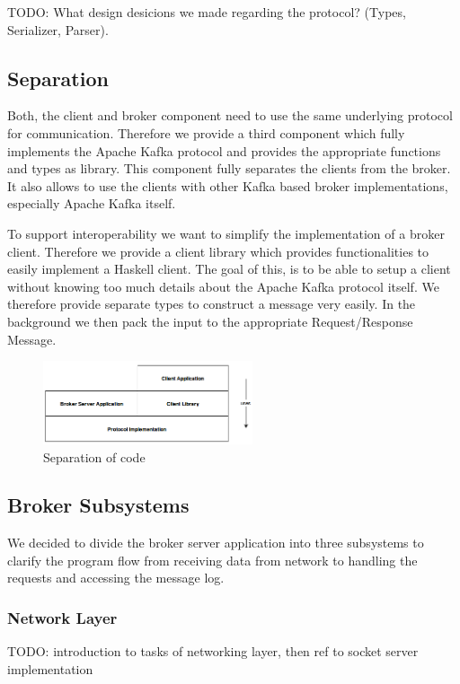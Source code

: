 TODO: What design desicions we made regarding the protocol? (Types, Serializer,
Parser). 

\subsection{Separation} 
Both, the client and broker component need to use the same underlying protocol for
communication. Therefore we provide a third component which fully implements the Apache Kafka
protocol  and provides the appropriate functions and types as library.
This component fully separates the clients from the broker. It also allows to
use the clients with other Kafka based broker implementations, especially Apache
Kafka itself. 

To support interoperability we want to simplify the implementation of a broker
client. Therefore we provide a client library which provides functionalities to
easily implement a Haskell client. The goal of this, is to be able to
setup a client without knowing too much details about the Apache Kafka protocol
itself. We therefore provide separate types to construct a message very easily.
In the background we then pack the input to the appropriate Request/Response
Message. 

\begin{figure}[H]
    \centering
    \includegraphics[width=0.55\textwidth]{images/architecture-components.png}
    \caption{Separation of code}
    \label{fig:architecture-components.png}
\end{figure}

\subsection{Broker Subsystems}
We decided to divide the broker server application into three subsystems to
clarify the program flow from receiving data from network to handling the
requests and accessing the message log. 
\subsubsection{Network Layer}

TODO: introduction to tasks of networking layer, then ref to socket server implementation

